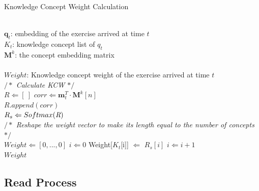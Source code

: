 \documentclass{edm_template}
\begin{document}
\renewcommand{\algorithmicrequire}{ \textbf{Input:}} %
\renewcommand{\algorithmicensure}{ \textbf{Output:}} %
\begin{algorithm}
\caption{Knowledge Concept Weight Calculation}
\label{alg1} %
\begin{algorithmic}[1]
	\small
	\REQUIRE ~~\\
	$\textbf{q}_t$: embedding of the exercise arrived at time $t$\\
	\textbf{$K_t$}: knowledge concept list of $q_t$\\
	$\textbf{M}^k$: the concept embedding matrix\\

    \ENSURE ~~\\
    $Weight$: Knowledge concept weight of the exercise arrived at time $t$\\
    \vspace{1ex}
    \emph{$/*$ Calculate KCW $*/$} \\
    \STATE $R \Leftarrow [\ ]$
    \STATE $corr \Leftarrow \textbf{m}_t^T\cdot\textbf{M}^k[n]$ \\
    \STATE $R.append(corr)$
    \ENDFOR \\
    \STATE $R_s \Leftarrow Softmax(\emph{R})$ \\
    \vspace{1ex}
    \emph{$/*$ Reshape the weight vector to make its length equal to the number of concepts$*/$} \\
    \STATE $Weight \Leftarrow [0,...,0]$
    \STATE $i \Leftarrow 0$
	    \STATE Weight[\textbf{$K_t$}[i]] $\Leftarrow$ $R_s[i]$
	    \STATE $i \Leftarrow i + 1$\\
    \ENDFOR
    \RETURN $Weight$

\end{algorithmic}
\end{algorithm}

\subsection{Read Process}
\end{document}
